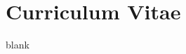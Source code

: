 \documentclass[11pt]{report}
\begin{document}

\newpage
\singlespace






\chapter*{Curriculum Vitae}
blank
\end{document}
